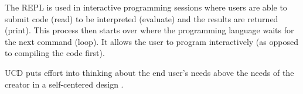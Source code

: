 \documentclass[../main.tex]{subfiles}
\begin{document}


  The REPL is used in interactive programming sessions where users are able to
  submit code (read) to be interpreted (evaluate) and the results are returned (print).
  This process then starts over where the programming language waits for the next command (loop).
  It allows the user to program interactively (as opposed to compiling the code first).


  UCD puts effort into thinking about the end user's needs above the needs of the creator in a self-centered design
  \cite{pruittPersonaLifecycleKeeping2006, tognazziniTogSoftwareDesign1748}.

\end{document}
